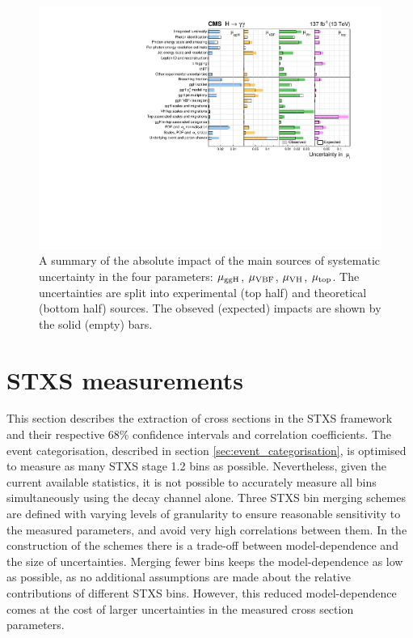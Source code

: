 \begin{figure}[htb!]
  \centering
  \includegraphics[width=1\textwidth]{Figures/hgg_results/mu_systematics.pdf}
  \caption[Impact of systematic uncertainty sources on the per-production mode signal strengths]
  {
    A summary of the absolute impact of the main sources of systematic uncertainty in the four parameters: $\mu_{\rm{ggH}}$, $\mu_{\rm{VBF}}$, $\mu_{\rm{VH}}$, $\mu_{\rm{top}}$. The uncertainties are split into experimental (top half) and theoretical (bottom half) sources. The obseved (expected) impacts are shown by the solid (empty) bars.
  }
  \label{fig:syst_mu}
\end{figure}

\FloatBarrier
\section{STXS measurements}\label{sec:results_STXS}
This section describes the extraction of cross sections in the STXS framework and their respective 68\% confidence intervals and correlation coefficients. The event categorisation, described in section \ref{sec:event_categorisation}, is optimised to measure as many STXS stage 1.2 bins as possible. Nevertheless, given the current available statistics, it is not possible to accurately measure all bins simultaneously using the \Hgg decay channel alone. Three STXS bin merging schemes are defined with varying levels of granularity to ensure reasonable sensitivity to the measured parameters, and avoid very high correlations between them. In the construction of the schemes there is a trade-off between model-dependence and the size of uncertainties. Merging fewer bins keeps the model-dependence as low as possible, as no additional assumptions are made about the relative contributions of different STXS bins. However, this reduced model-dependence comes at the cost of larger uncertainties in the measured cross section parameters.

